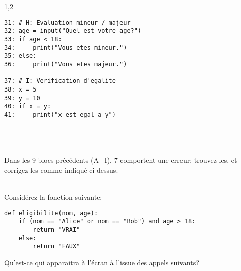 \documentclass[11pt,a4paper]{exam}
\begin{document}
\begin{questions}
\begin{spacing}{1,2}
\begin{minipage}{0.5\textwidth}
\begin{verbatim}
31: # H: Evaluation mineur / majeur
32: age = input("Quel est votre age?")
33: if age < 18:
34:     print("Vous etes mineur.")
35: else:
36:     print("Vous etes majeur.")

37: # I: Verification d'egalite
38: x = 5
39: y = 10
40: if x = y:
41:     print("x est egal a y")
                \end{verbatim}
            \end{minipage}
            \leavevmode
            \\
            \\
            \\
            Dans les 9 blocs précédents (A \textemdash\ I), 7 comportent une erreur: trouvez-les, et corrigez-les comme indiqué ci-dessus.
            \newpage

            \leavevmode
            \\
            \question Considérez la fonction suivante:
            \begin{verbatim}
def eligibilite(nom, age):
    if (nom == "Alice" or nom == "Bob") and age > 18:
        return "VRAI"
    else:
        return "FAUX"
            \end{verbatim}
            Qu'est-ce qui apparaitra à l'écran à l'issue des appels suivants?
        

\end{spacing}
\end{questions}
\end{document}
